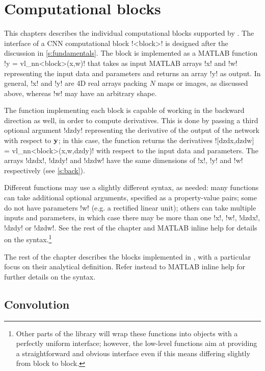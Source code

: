 \chapter{Computational blocks}\label{s:blocks}

This chapters describes the individual computational blocks supported by \matconvnet. The interface of a CNN computational block !<block>! is designed after the discussion in \autoref{s:fundamentals}. The block is implemented as a MATLAB function !y = vl_nn<block>(x,w)! that takes as input MATLAB arrays !x! and !w! representing the input data and parameters and returns an array !y! as output. In general, !x! and !y! are 4D real arrays packing $N$ maps or images, as discussed above, whereas !w! may have an arbitrary shape.

The function implementing each block is capable of working in the backward direction as well, in order to compute derivatives. This is done by passing a third optional argument !dzdy! representing the derivative of the output of the network with respect to $\mathbf{y}$; in this case, the function returns the derivatives ![dzdx,dzdw] = vl_nn<block>(x,w,dzdy)! with respect to the input data and parameters. The arrays !dzdx!, !dzdy! and !dzdw! have the same dimensions of !x!, !y! and !w! respectively (see \autoref{s:back}).

Different functions may use a slightly different syntax, as needed: many functions can take additional optional arguments, specified as a property-value pairs; some do not have parameters  !w! (e.g. a rectified linear unit); others can take multiple inputs and parameters, in which case there may be more than one !x!, !w!, !dzdx!, !dzdy! or !dzdw!. See the rest of the chapter and MATLAB inline help for details on the syntax.\footnote{Other parts of the library will wrap these functions into objects with a perfectly uniform interface; however, the low-level functions aim at providing a straightforward and obvious interface even if this means differing slightly from block to block.}

The rest of the chapter describes the blocks implemented in \matconvnet, with a particular focus on their analytical definition. Refer instead to MATLAB inline help for further details on the syntax.

\section{Convolution}\label{s:convolution}

